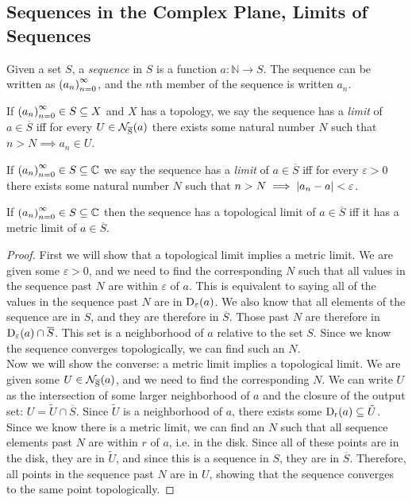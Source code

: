 \documentclass{refbook}
\begin{document}
\subsection{Sequences in the Complex Plane, Limits of Sequences}
\begin{definition}[Sequence]
Given a set $S$, a \emph{sequence} in $S$ is a function $a : \mathbb{N} \longrightarrow S$. The sequence can be written as $\seq{a}$, and the $n$th member of the sequence is written $a_n$.
\end{definition}
\begin{definition}
If $\seq{a} \in S \subseteq X$ and $X$ has a topology, we say the sequence has a \emph{limit} of $a \in \overline{S}$ iff for every $U \in \rnbhd{a}{\overline{S}}$ there exists some natural number $N$ such that $n>N \implies a_n \in U$.
\end{definition}
\begin{definition}
If $\seq{a} \in S \subseteq \mathbb{C}$ we say the sequence has a \emph{limit} of $a \in \overline{S}$ iff for every $\varepsilon > 0$ there exists some natural number $N$ such that $n > N \implies \modulus{a_n-a} < \varepsilon$.
\end{definition}
\begin{theorem}
If $\seq{a} \in S \subseteq \mathbb{C}$ then the sequence has a topological limit of $a \in \overline{S}$ iff it has a metric limit of $a \in \overline{S}$.
\end{theorem}
\begin{proof}
First we will show that a topological limit implies a metric limit. We are given some $\varepsilon > 0$, and we need to find the corresponding $N$ such that all values in the sequence past $N$ are within $\varepsilon$ of $a$. This is equivalent to saying all of the values in the sequence past $N$ are in $\disk{a}{\varepsilon}$. We also know that all elements of the sequence are in $S$, and they are therefore in $\overline{S}$. Those past $N$ are therefore in $\disk{a}{\varepsilon} \cap \overline{S}$. This set is a neighborhood of $a$ relative to the set $S$. Since we know the sequence converges topologically, we can find such an $N$.\\
Now we will show the converse: a metric limit implies a topological limit. We are given some $U \in \rnbhd{a}{\overline{S}}$, and we need to find the corresponding $N$. We can write $U$ as the intersection of some larger neighborhood of $a$ and the closure of the output set: $U = \tilde{U} \cap \overline{S}$. Since $\tilde{U}$ is a neighborhood of $a$, there exists some $\disk{a}{r} \subseteq \tilde{U}$. Since we know there is a metric limit, we can find an $N$ such that all sequence elements past $N$ are within $r$ of $a$, i.e. in the disk. Since all of these points are in the disk, they are in $\tilde{U}$, and since this is a sequence in $S$, they are in $\overline{S}$. Therefore, all points in the sequence past $N$ are in $U$, showing that the sequence converges to the same point topologically.
\end{proof}
\end{document}
